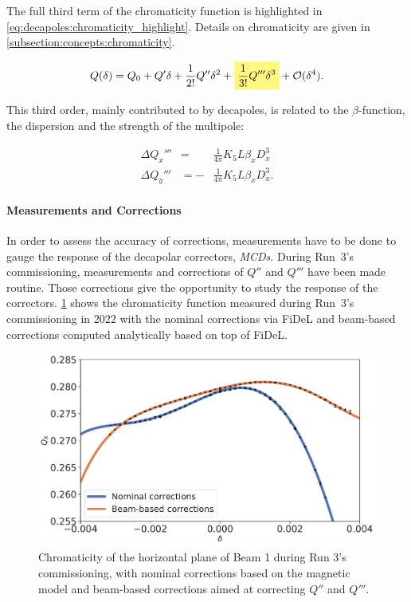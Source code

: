 The full third term of the chromaticity function is highlighted in
\cref{eq:decapoles:chromaticity_highlight}. Details on chromaticity are given
in \cref{subsection:concepts:chromaticity}.

\begin{equation} 
    Q (\delta) = Q_0 + Q' \delta + \frac{1}{2!} Q'' \delta^2 
                     + \colorbox{yellow!50}{$\displaystyle  \frac{1}{3!}  Q''' \delta^3$}
                     + \mathcal{O}(\delta^4).
    \label{eq:decapoles:chromaticity_highlight}
\end{equation}

This third order, mainly contributed to by decapoles, is related to the $\beta$-function, the
dispersion and the strength of the multipole:

\begin{equation}
    \begin{aligned}
        \Delta Q_x''' &=  &\frac{1}{4\pi} K_{5} L \beta_x D_x^{3}\\
        \Delta Q_y''' &= -&\frac{1}{4\pi} K_{5} L \beta_x D_x^{3}.
    \end{aligned}
\end{equation}


\paragraph{Measurements and Corrections}

In order to assess the accuracy of corrections, measurements have to be done to gauge the response
of the decapolar correctors, \textit{MCDs}.
During Run~3's commissioning, measurements and corrections of $Q''$ and $Q'''$ have been made
routine. Those corrections give the opportunity to study the response of the correctors.
\cref{figure:decapoles:chromaticity:dq3_comparison} shows the chromaticity function measured during
Run~3's commissioning in 2022 with the nominal corrections via FiDeL and beam-based corrections
computed analytically based on top of FiDeL.

\begin{figure}[H]
    \centering
    \includegraphics[width=0.8\columnwidth]{images/nominal_vs_beam_based_corrections.pdf}
    \caption{Chromaticity of the horizontal plane of Beam 1 during Run 3's commissioning, with
    nominal corrections based on the magnetic model and beam-based corrections aimed at correcting
     $Q''$ and $Q'''$.}
    \label{figure:decapoles:chromaticity:dq3_comparison}
\end{figure}


